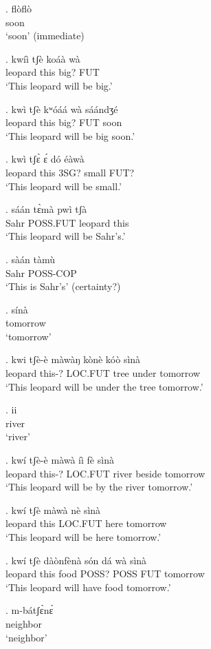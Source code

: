 \documentclass{assets/fieldnotes}
\begin{document}
{\exg. flòflò \\
soon\\
`soon' (immediate)

\exg. kwíì tʃè koáà wà \\
leopard this big? FUT \\
`This leopard will be big.'

\exg. kwì tʃè kʷóáá wà sáándʒé \\
leopard this big? FUT soon \\
`This leopard will be big soon.'

\exg. kwì tʃɛ̀ ɛ́ dó éàwà \\
leopard this 3SG? small FUT? \\
`This leopard will be small.'

\exg. sáán tɛ̀mà pwì tʃà \\
Sahr POSS.FUT leopard this \\
`This leopard will be Sahr's.'

\exg. sàán tàmù \\
Sahr POSS-COP \\
`This is Sahr's' (certainty?)

\exg. sínà \\
tomorrow\\
`tomorrow' 

\exg. kwi tʃè-è màwàŋ kònè kóò sìnà \\
leopard this-? LOC.FUT tree under tomorrow \\
`This leopard will be under the tree tomorrow.' %

\exg. ii \\
river\\
`river'

\exg. kwí tʃè-è màwà íì fè sìnà  \\
leopard this-? LOC.FUT river beside tomorrow \\
`This leopard will be by the river tomorrow.'

\exg. kwí tʃè màwà nè sìnà \\
leopard this LOC.FUT here tomorrow \\ 
`This leopard will be here tomorrow.'


\exg. kwí tʃè dàònfènà són dá wà sìnà \\
leopard this food POSS? POSS FUT tomorrow \\
`This leopard will have food tomorrow.'


\exg. m-bátʃɛ̀nɛ́ \\
neighbor\\
`neighbor'

}
\end{document}
